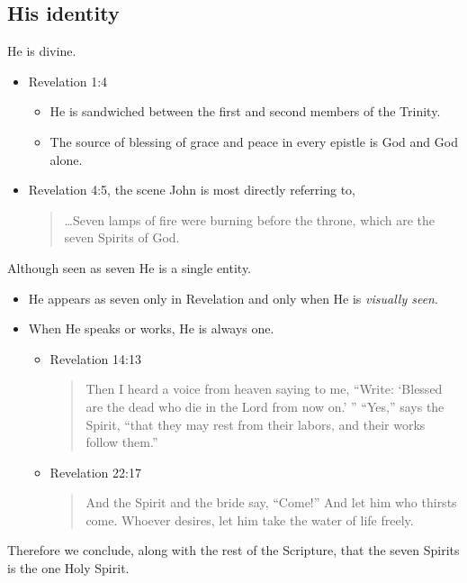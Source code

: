 \documentclass[12pt]{article}
\newcommand{\BI}{\begin{itemize}}
\newcommand{\EI}{\end{itemize}}
\newcommand{\I}{\item}
\newcommand{\Q}[1]{\begin{quote} #1 \end{quote}}
\begin{document}
\subsection{His identity}
\I  He is divine.
\BI \I  Revelation 1:4 
    \BI \I  He is sandwiched between the first and second members of the Trinity.
        \I  The source of blessing of grace and peace in every epistle is 
            God and God alone. \EI
    \I  Revelation 4:5, the scene John is most directly referring to,
        \Q{\ldots Seven lamps of fire were burning before the throne,
            which are the seven Spirits of God.} \EI
\I  Although seen as seven He is a single entity.
\BI \I  He appears as seven only in Revelation and only 
        when He is \emph{visually seen}.
    \I  When He speaks or works, He is always one.
    \BI \I  Revelation 14:13
            \Q{ Then I heard a voice from heaven saying to me,
                ``Write: `Blessed are the dead who die in the Lord from now on.' ''
                ``Yes,'' says the Spirit, 
                ``that they may rest from their labors, 
                and their works follow them.''} 
        \I  Revelation 22:17
            \Q{ And the Spirit and the bride say, ``Come!''
                And let him who thirsts come.
                Whoever desires, let him take the water of life freely.} \EI \EI
\I  Therefore we conclude, along with the rest of the Scripture,
    that the seven Spirits is the one Holy Spirit.
    
\end{document}
